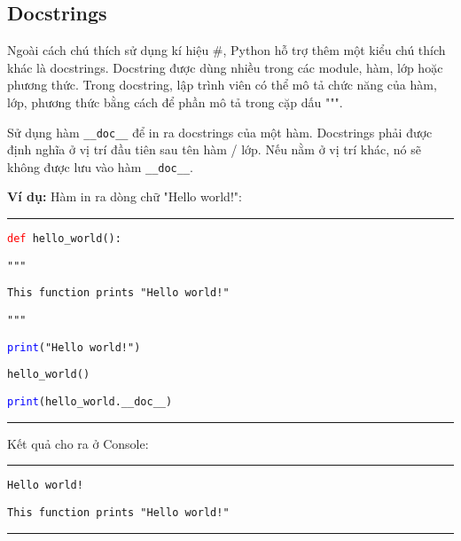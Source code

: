 \subsection{Docstrings}
Ngoài cách chú thích sử dụng kí hiệu \#, Python hỗ trợ thêm một kiểu chú thích khác là docstrings. Docstring được dùng nhiều trong các module, hàm, lớp hoặc phương thức. Trong docstring, lập trình viên có thể mô tả chức năng của hàm, lớp, phương thức bằng cách để phần mô tả trong cặp dấu """.\par
Sử dụng hàm \texttt{\_\_doc\_\_} để in ra docstrings của một hàm. Docstrings phải được định nghĩa ở vị trí đầu tiên sau tên hàm / lớp. Nếu nằm ở vị trí khác, nó sẽ không được lưu vào hàm \texttt{\_\_doc\_\_}.\par
\textbf{Ví dụ:} Hàm in ra dòng chữ "Hello world!":\\
\rule{\linewidth}{0.2mm}\par
\begin{linenumbers}
	\texttt{\textcolor{red}{def} hello\_world():}\par
	\qquad\texttt{"""}\par
	\qquad\texttt{This function prints "Hello world!"}\par
	\qquad\texttt{"""}\par
	\qquad\texttt{\textcolor{blue}{print}("Hello world!")}\par
	\medskip
	\texttt{hello\_world()}\par
	\texttt{\textcolor{blue}{print}(hello\_world.\_\_doc\_\_)}
\end{linenumbers}
\rule{\linewidth}{0.2mm}\par
\noindent
\resetlinenumber
Kết quả cho ra ở Console:\\
\rule{\linewidth}{0.2mm}\par
\begin{linenumbers}
	\texttt{Hello world!}\par
	\texttt{}\par
	\qquad\texttt{This function prints "Hello world!"}\par
	\texttt{}
\end{linenumbers}
\rule{\linewidth}{0.2mm}
\resetlinenumber
\newpage